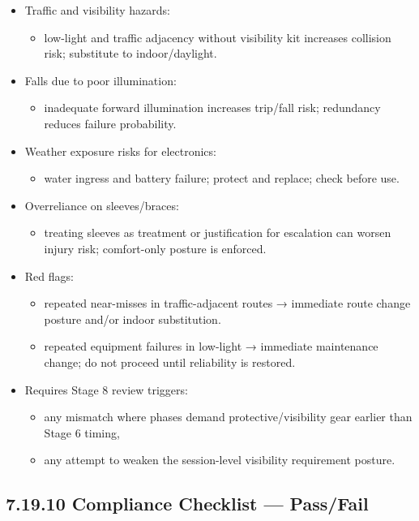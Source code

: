 \documentclass[10pt]{article}
\begin{document}
\begin{itemize}
\item Traffic and visibility hazards:
  \begin{itemize}
  \item low-light and traffic adjacency without visibility kit increases collision risk; substitute to indoor/daylight.
  \end{itemize}
\item Falls due to poor illumination:
  \begin{itemize}
  \item inadequate forward illumination increases trip/fall risk; redundancy reduces failure probability.
  \end{itemize}
\item Weather exposure risks for electronics:
  \begin{itemize}
  \item water ingress and battery failure; protect and replace; check before use.
  \end{itemize}
\item Overreliance on sleeves/braces:
  \begin{itemize}
  \item treating sleeves as treatment or justification for escalation can worsen injury risk; comfort-only posture is enforced.
  \end{itemize}
\item Red flags:
  \begin{itemize}
  \item repeated near-misses in traffic-adjacent routes → immediate route change posture and/or indoor substitution.
  \item repeated equipment failures in low-light → immediate maintenance change; do not proceed until reliability is restored.
  \end{itemize}
\item Requires Stage 8 review triggers:
  \begin{itemize}
  \item any mismatch where phases demand protective/visibility gear earlier than Stage 6 timing,
  \item any attempt to weaken the session-level visibility requirement posture.
  \end{itemize}
\end{itemize}

\subsection*{7.19.10 Compliance Checklist — Pass/Fail}
{}
\end{document}
